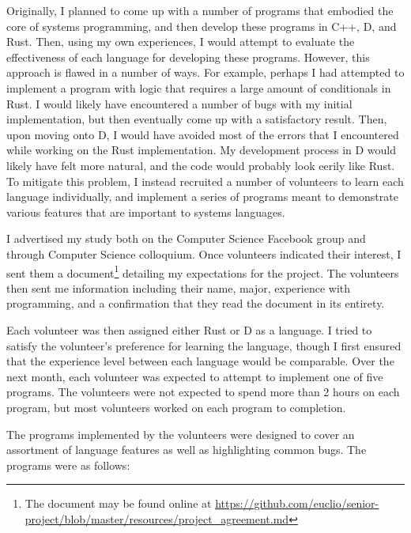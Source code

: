 \documentclass[draftcopy]{srpaper}
\begin{document}
Originally, I planned to come up with a number of programs that embodied the
core of systems programming, and then develop these programs in C++, D, and
Rust. Then, using my own experiences, I would attempt to evaluate the
effectiveness of each language for developing these programs. However, this
approach is flawed in a number of ways. For example, perhaps I had attempted to
implement a program with logic that requires a large amount of conditionals in
Rust. I would likely have encountered a number of bugs with my initial
implementation, but then eventually come up with a satisfactory result. Then,
upon moving onto D, I would have avoided most of the errors that I encountered
while working on the Rust implementation. My development process in D would
likely have felt more natural, and the code would probably look eerily like
Rust. To mitigate this problem, I instead recruited a number of volunteers to
learn each language individually, and implement a series of programs meant to
demonstrate various features that are important to systems languages.

I advertised my study both on the Computer Science Facebook group and through
Computer Science colloquium. Once volunteers indicated their interest, I sent
them a document\footnote{The document may be found online at
\url{https://github.com/euclio/senior-project/blob/master/resources/project_agreement.md}}
detailing my expectations for the project. The volunteers then sent me
information including their name, major, experience with programming, and a
confirmation that they read the document in its entirety.

Each volunteer was then assigned either Rust or D as a language. I tried to
satisfy the volunteer's preference for learning the language, though I first
ensured that the experience level between each language would be comparable.
Over the next month, each volunteer was expected to attempt to implement one
of five programs. The volunteers were not expected to spend more than 2 hours
on each program, but most volunteers worked on each program to completion.

The programs implemented by the volunteers were designed to cover an
assortment of language features as well as highlighting common bugs. The
programs were as follows:
\end{document}
